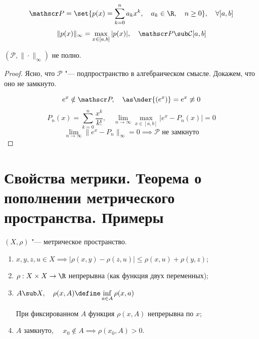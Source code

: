 \begin{eg}
	$$ \mathscr P = \set{p(x) = \sum_{k = 0}^n a_kx^k, \quad a_k \in \R, \quad n \ge 0}, \quad \forall [a, b] $$
	$$ \|p(x)\|_\infty = \max\limits_{x \in [a, b]}|p(x)|, \quad \mathscr P \sub \mathcal C[a, b] $$
\end{eg}

\begin{statement}
	$ (\mathscr P, \|\cdot\|_\infty) $ не полно.
\end{statement}

\begin{proof}
	Ясно, что $ \mathscr P $ "--- подпространство в алгебраическом смысле.
	Докажем, что оно не замкнуто.

	$$ e^x \notin \mathscr P, \quad \as \nder{(e^x)} = e^x \not\equiv 0 $$
	$$ P_n(x) = \sum_{k = 0}^n \frac{x^k}{k!}, \quad \lim\limits_{n \to \infty}\max\limits_{x \in [a, b]}|e^x - P_n(x)| = 0 $$
	$$ \lim\limits_{n \to \infty} \|e^x - P_n\|_\infty = 0 \implies \mathscr P \text{ не замкнуто} $$
\end{proof}

\section{Свойства метрики.
Теорема о пополнении метрического пространства.
Примеры}

\begin{properties}
	$ (X, \rho) $ "--- метрическое пространство.

	\begin{enumerate}
		\item $ x, y, z, u \in X \implies |\rho(x, y) - \rho(z, u)| \le \rho(x, u) + \rho(y, z) $;
		\item $ \rho : X \times X \to \R $ непрерывна (как функция двух переменных);
		\item $ A \sub X, \quad \rho(x, A) \define \inf\limits_{a \in A} \rho(x, a) $

			При фиксированном $ A $ функция $ \rho(x, A) $ непрерывна по $ x $;
		\item $ A $ замкнуто, $ \quad x_0 \notin A \implies \rho(x_0, A) > 0 $.
	\end{enumerate}
\end{properties}

